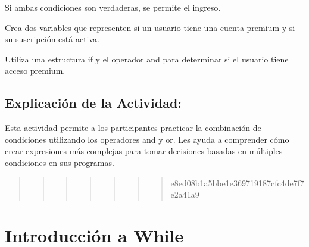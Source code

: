 \documentclass[
  a4paper,
  DIV=11,
  numbers=noendperiod,
  onepage,
  openany]{scrreprt}
\begin{document}
Si ambas condiciones son verdaderas, se permite el ingreso.

\begin{tcolorbox}[enhanced jigsaw, colbacktitle=quarto-callout-important-color!10!white, toprule=.15mm, leftrule=.75mm, titlerule=0mm, opacityback=0, rightrule=.15mm, opacitybacktitle=0.6, breakable, left=2mm, coltitle=black, title=\textcolor{quarto-callout-important-color}{\faExclamation}\hspace{0.5em}{Actividad Práctica:}, toptitle=1mm, bottomtitle=1mm, arc=.35mm, bottomrule=.15mm, colback=white, colframe=quarto-callout-important-color-frame]

Crea dos variables que representen si un usuario tiene una cuenta
premium y si su suscripción está activa.

Utiliza una estructura if y el operador and para determinar si el
usuario tiene acceso premium.

\end{tcolorbox}

\hypertarget{explicaciuxf3n-de-la-actividad-33}{%
\section{Explicación de la
Actividad:}\label{explicaciuxf3n-de-la-actividad-33}}

Esta actividad permite a los participantes practicar la combinación de
condiciones utilizando los operadores and y or. Les ayuda a comprender
cómo crear expresiones más complejas para tomar decisiones basadas en
múltiples condiciones en sus programas.

\begin{quote}
\begin{quote}
\begin{quote}
\begin{quote}
\begin{quote}
\begin{quote}
\begin{quote}
e8ed08b1a5bbe1e369719187cfc4de7f7e2a41a9
\end{quote}
\end{quote}
\end{quote}
\end{quote}
\end{quote}
\end{quote}
\end{quote}

\hypertarget{introducciuxf3n-a-while}{%
\chapter{Introducción a While}\label{introducciuxf3n-a-while}}
\end{document}
